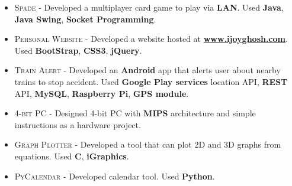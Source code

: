 \documentclass[letterpaper,10pt]{article}
\begin{document}
\begin{itemize}
    \item \textsc{Spade} - 
        Developed a multiplayer card game to play via \textbf{LAN}.
        Used \textbf{Java}, \textbf{Java Swing}, \textbf{Socket Programming}.
    
    \item \textsc{Personal Website} - 
        Developed a website hosted at \href{http://www.ijoyghosh.com}{\textbf{www.ijoyghosh.com}}.
        Used \textbf{BootStrap}, \textbf{CSS3}, \textbf{jQuery}.
    
    \item \textsc{Train Alert} - 
        Developed an \textbf{Android} app that alerts user about nearby trains to stop accident.
        Used \textbf{Google Play services} location API, \textbf{REST} API, \textbf{MySQL}, \textbf{Raspberry Pi}, \textbf{GPS module}.
    
   \item \textsc{4-bit PC} -  
       Designed 4-bit PC with \textbf{MIPS} architecture and  simple instructions as a hardware project.
   
   \item \textsc{Graph Plotter} - 
       Developed a tool that can plot \textsc{2D} and \textsc{3D} graphs from equations.
       Used \textbf{C}, \textbf{iGraphics}.
   
   \item \textsc{PyCalendar} - 
       Developed calendar tool. 
       Used \textbf{Python}.

\end{itemize}
\end{document}
